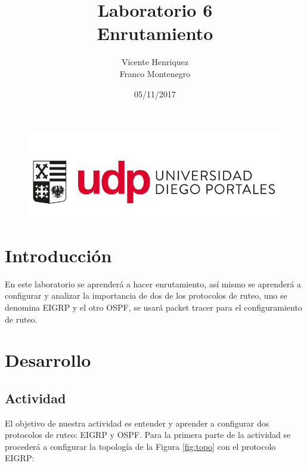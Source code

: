 \documentclass{article}
\begin{document}
\begin{figure}[t!]
\includegraphics[scale=0.3]{logo_udp.PNG}
\label{fig:udplogo}
\end{figure}



\title{\textbf{{Laboratorio 6 \\ Enrutamiento\vspace{10cm}}}}
\author{\hspace{8cm} Vicente Henriquez \\ \hspace{8cm} Franco Montenegro}
\date{\hspace{8cm} 05/11/2017}



\maketitle
\newpage
\tableofcontents
\newpage
\section{Introducción\vspace{0.5cm}}
En este laboratorio se aprenderá a hacer enrutamiento, así mismo se aprenderá a configurar y analizar la importancia de dos de los protocolos de ruteo, uno se denomina EIGRP y el otro OSPF, se usará packet tracer para el configuramiento de ruteo.
\newpage
\section{Desarrollo\vspace{0.5cm}}
\subsection{Actividad\vspace{0.3cm}}
El objetivo de nuestra actividad es entender y aprender a configurar dos protocolos de ruteo: EIGRP y OSPF.
Para la primera parte de la actividad se procederá a configurar la topología de la Figura \ref{fig:topo} con el protocolo EIGRP:
\end{document}
